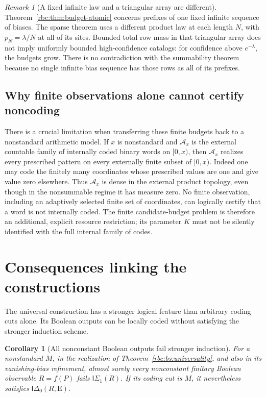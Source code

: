 \documentclass[11pt]{article}
\numberwithin{equation}{section}
\newtheorem{corollary}[theorem]{Corollary}
\theoremstyle{definition}
\theoremstyle{remark}
\newtheorem{remark}[theorem]{Remark}
\newcommand{\E}{\mathrm E}
\begin{document}
\begin{remark}[A fixed infinite law and a triangular array are different]
Theorem~\ref{rbc:thm:budget-atomic} concerns prefixes of one fixed infinite
sequence of biases. The sparse theorem uses a different product law at each
length $N$, with $p_N=\lambda/N$ at all of its sites. Bounded total row mass
in that triangular array does not imply uniformly bounded high-confidence
catalogs: for confidence above $e^{-\lambda}$, the budgets grow. There is
no contradiction with the summability theorem because no single infinite
bias sequence has those rows as all of its prefixes.
\end{remark}

\subsection{Why finite observations alone cannot certify noncoding}

There is a crucial limitation when transferring these finite budgets
back to a nonstandard arithmetic model.  If $x$ is nonstandard and
$\mathcal A_x$ is the external countable family of internally coded
binary words on $[0,x)$, then $\mathcal A_x$ realizes every prescribed
pattern on every externally finite subset of $[0,x)$.  Indeed one may
code the finitely many coordinates whose prescribed values are one and
give value zero elsewhere.  Thus $\mathcal A_x$ is dense in the external
product topology, even though in the nonsummable regime it has measure
zero.  No finite observation, including an adaptively selected finite
set of coordinates, can logically certify that a word is not internally
coded.  The finite candidate-budget problem is therefore an additional,
explicit resource restriction; its parameter $K$ must not be silently
identified with the full internal family of codes.




\section{Consequences linking the constructions}
\label{rbc:sec:consequences}

The universal construction has a stronger logical feature than arbitrary
coding cuts alone. Its Boolean outputs can be locally coded without
satisfying the stronger induction scheme.

\begin{corollary}[All nonconstant Boolean outputs fail stronger induction]
\label{rbc:cor:boolean-induction}
For a nonstandard $M$, in the realization of
Theorem~\ref{rbc:bs:universality}, and also in its vanishing-bias refinement,
almost surely every nonconstant finitary Boolean observable $R=f(P)$
fails $\mathsf I\Sigma_1(R)$. If its coding cut is $M$, it nevertheless
satisfies $\mathsf I\Delta_0(R,\E)$.
\end{corollary}
\end{document}
